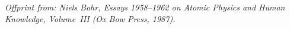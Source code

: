 \documentclass[12pt,a4paper]{article}
\begin{document}
\thispagestyle{fancy}
{\footnotesize\itshape Offprint from: Niels Bohr, \emph{Essays 1958--1962 on Atomic Physics and Human Knowledge}, Volume~III
 (Ox Bow Press, 1987).\par}
\medskip


\end{document}
